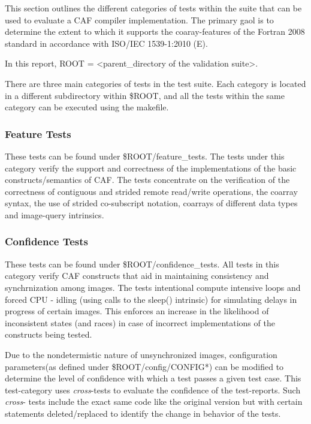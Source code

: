 This section outlines the different categories of tests within the suite 
that can be used to evaluate a CAF compiler
implementation. The primary gaol is to determine the extent to which it supports the
coaray-features of the Fortran 2008 standard in accordance with
ISO/IEC 1539-1:2010 (E)\cite{ftn2008}.


In this report, ROOT = <parent\_directory of the validation suite>.

There are three main categories of tests in the test suite. Each category is located in a different subdirectory within \$ROOT, and all the tests within the same category can be executed using the makefile. 

\subsubsection{Feature Tests}

These tests can be found under \$ROOT/feature\_tests. The tests under this category verify the support and correctness of the implementations of the basic constructs/semantics of CAF. The tests concentrate on the verification of the correctness of contiguous and strided remote read/write operations, the coarray syntax, the use of strided co-subscript notation, coarrays of different data types and
image-query intrinsics.


\subsubsection{Confidence Tests}

These tests can be found under \$ROOT/confidence\_tests. All tests in this
category verify CAF constructs that aid in maintaining consistency and synchrnization among images. The tests intentional compute intensive loops and forced CPU - idling (using calls to the sleep() intrinsic) for simulating delays in progress of certain images.
This enforces an increase in the likelihood of inconsistent states (and races) in case of incorrect implementations of the constructs being tested.

Due to the nondetermistic nature of unsynchronized images, configuration parameters(as defined under \$ROOT/config/CONFIG*) can be modified to determine the level of confidence with which a test passes a given test case. This test-category uses \emph{cross}-tests to evaluate the confidence of the test-reports. Such \emph{cross}- tests include the exact same code like the
original version but with certain statements deleted/replaced to identify the change in behavior of the tests. 


